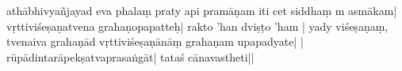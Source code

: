 athābhivyañjayad eva phalaṃ praty api pramāṇam iti ce\mde t 
siddhaṃ m asmāka\mds m| 
vṛttiviśeṣaṇatvena grahaṇopapatteḥ| 
rakto ’ha\mde n dviṣṭo ’ham 
%
| yady 
%
viśeṣaṇaṃ, 
%
\mds tvenai\-va grahaṇād vṛttiviśeṣaṇ\mde ānā\mds ṃ 
grahaṇam upapadyate| %
| rūpādintarāpekṣatvaprasaṅgāt| tataś cānavastheti||

